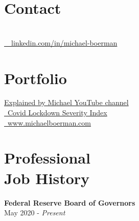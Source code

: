 \documentclass[margin,line]{res}
\begin{document}

\begin{resume}
\section{\sc Contact}

 \\
\faLinkedinIn  \href{https://www.linkedin.com/in/michael-boerman}{\ttfamily \, \, linkedin.com/in/michael-boerman}\\
\vspace{-.35cm}



\section{\sc Portfolio}
 \href{https://www.youtube.com/channel/UCxFMrMb6PrS7SOrQi-BfMUw/videos?view=0&sort=p&flow=grid}{ Explained by Michael YouTube channel}\\
\faChartLine \href{https://github.com/michaelboerman/lockdown_severity_index#readme}{\, Covid Lockdown Severity Index}\\
\faBriefcase \href{https://www.michaelboerman.com/}{\ttfamily  \, www.michaelboerman.com}\\


\vspace{-.35cm}
\section{\sc Professional \\ Job History}
{\bf Federal Reserve Board of Governors}\\
May 2020 - {\it Present}\\
\vspace{-.65cm}


\end{resume}
\end{document}
